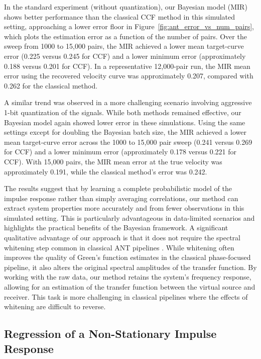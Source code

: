 \documentclass[preprint,1p,times,authoryear]{elsarticle}
\begin{document}
In the standard experiment (without quantization), our Bayesian model (MIR) shows better performance than the classical CCF method in this simulated setting, approaching a lower error floor in Figure~\ref{fig:ant_error_vs_num_pairs}, which plots the estimation error as a function of the number of pairs. Over the sweep from 1000 to 15{,}000 pairs, the MIR achieved a lower mean target-curve error (0.225 versus 0.245 for CCF) and a lower minimum error (approximately 0.188 versus 0.201 for CCF). In a representative 12{,}000-pair run, the MIR mean error using the recovered velocity curve was approximately 0.207, compared with 0.262 for the classical method.

A similar trend was observed in a more challenging scenario involving aggressive 1-bit quantization of the signals. While both methods remained effective, our Bayesian model again showed lower error in these simulations. Using the same settings except for doubling the Bayesian batch size, the MIR achieved a lower mean target-curve error across the 1000 to 15{,}000 pair sweep (0.241 versus 0.269 for CCF) and a lower minimum error (approximately 0.178 versus 0.221 for CCF). With 15{,}000 pairs, the MIR mean error at the true velocity was approximately 0.191, while the classical method's error was 0.242.

The results suggest that by learning a complete probabilistic model of the impulse response rather than simply averaging correlations, our method can extract system properties more accurately and from fewer observations in this simulated setting. This is particularly advantageous in data-limited scenarios and highlights the practical benefits of the Bayesian framework. A significant qualitative advantage of our approach is that it does not require the spectral whitening step common in classical ANT pipelines \citep{Bensen2007}. While whitening often improves the quality of Green's function estimates in the classical phase-focused pipeline, it also alters the original spectral amplitudes of the transfer function. By working with the raw data, our method retains the system's frequency response, allowing for an estimation of the transfer function between the virtual source and receiver. This task is more challenging in classical pipelines where the effects of whitening are difficult to reverse.

\subsection{Regression of a Non-Stationary Impulse Response}
\end{document}
